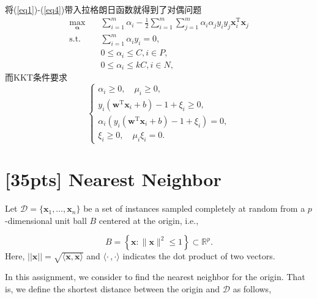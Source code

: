 \documentclass{article}
\begin{document}
    将(\ref{eq1})-(\ref{eq4})带入拉格朗日函数就得到了对偶问题
    \begin{equation}
        \begin{split}
            \max_{\boldsymbol{\alpha}}& \quad \sum_{i=1}^m \alpha_i - \frac{1}{2} \sum_{i=1}^m \sum_{j=1}^m \alpha_i \alpha_j y_i y_j \boldsymbol{x}_i^\mathrm{T}\boldsymbol{x}_j\\
            \text{s.t.}&  \quad \sum_{i=1}^m \alpha_i y_i = 0,\\
            & \quad 0 \leq \alpha_i \leq C, i \in P,\\
            & \quad 0 \leq \alpha_i \leq kC, i \in N,
        \end{split}
    \end{equation}
    而KKT条件要求
    \begin{equation}
        \left\{
            \begin{array}{lr}
            \alpha_i \geq 0, \quad \mu_i \geq 0,\\
            y_i(\boldsymbol{w}^\mathrm{T}\boldsymbol{x}_i + b) -1 + \xi_i \geq 0,\\
            \alpha_i(y_i(\boldsymbol{w}^\mathrm{T}\boldsymbol{x}_i + b) -1 + \xi_i) = 0,\\
            \xi_i \geq 0, \quad \mu_i\xi_i = 0.
            \end{array}
        \right.
        \end{equation}


	\newpage
	
	\section{[35pts] {Nearest Neighbor}}
	
	Let $\mathcal{D} = \{\mathbf{x}_1, \dots, \mathbf{x}_n\}$ be a set of instances sampled completely at random from a $p$-dimensional unit ball $B$ centered at the origin, i.e.,
	
\begin{equation}
B=\left\{\mathbf{x} :\|\mathbf{x}\|^{2} \leq 1\right\} \subset \mathbb{R}^{p}.
\end{equation}
Here, $||\mathbf{x}|| = \sqrt{\langle \mathbf{x}, \mathbf{x}\rangle}$ and $\langle \cdot \,, \cdot \rangle$ indicates the dot product of two vectors.
	
In this assignment, we consider to find the nearest neighbor for the origin. That is, we define the shortest distance between the origin and $\mathcal{D}$ as follows,
\end{document}
